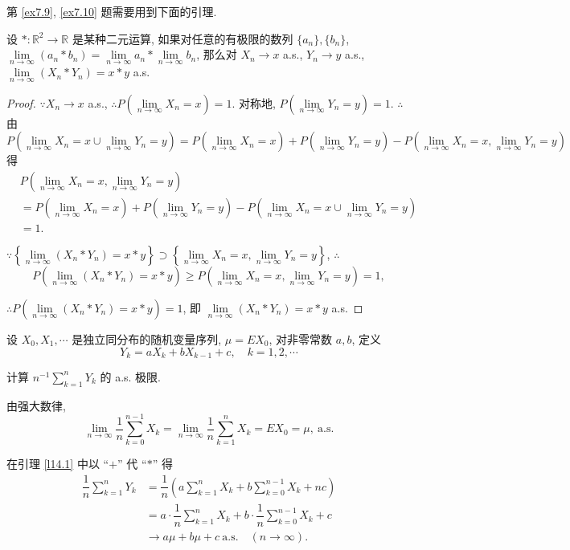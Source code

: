 \documentclass{ctexart}
\begin{document}
第 \ref{ex7.9}, \ref{ex7.10} 题需要用到下面的引理.
\begin{lemma}\label{l14.1}
    设 $*:\mathbb{R}^2\to\mathbb{R}$ 是某种二元运算, 如果对任意的有极限的数列 $\{a_n\},\{b_n\}$, $\lim\limits_{n\to\infty}(a_n*b_n)=\lim\limits_{n\to\infty}a_n*\lim\limits_{n\to\infty}b_n$, 那么对 $X_n\to x$ a.s., $Y_n\to y$ a.s., $\lim\limits_{n\to\infty}(X_n*Y_n)=x*y$ a.s.
\end{lemma}
\begin{proof}
    $\because X_n\to x$ a.s., $\therefore P\left(\lim\limits_{n\to\infty}X_n=x\right)=1$. 对称地, $P\left(\lim\limits_{n\to\infty}Y_n=y\right)=1$. $\therefore$ 由
    \[P\left(\lim\limits_{n\to\infty}X_n=x\cup\lim\limits_{n\to\infty}Y_n=y\right)=P\left(\lim\limits_{n\to\infty}X_n=x\right)+P\left(\lim\limits_{n\to\infty}Y_n=y\right)-P\left(\lim\limits_{n\to\infty}X_n=x,\lim\limits_{n\to\infty}Y_n=y\right)\]
    得
    \begin{align*}
        & P\left(\lim\limits_{n\to\infty}X_n=x,\lim\limits_{n\to\infty}Y_n=y\right) \\
        & =P\left(\lim\limits_{n\to\infty}X_n=x\right)+P\left(\lim\limits_{n\to\infty}Y_n=y\right)-P\left(\lim\limits_{n\to\infty}X_n=x\cup\lim\limits_{n\to\infty}Y_n=y\right) \\
        & =1.
    \end{align*}

    $\because\left\{\lim\limits_{n\to\infty}\left(X_n*Y_n\right)=x*y\right\}\supset\left\{\lim\limits_{n\to\infty}X_n=x,\lim\limits_{n\to\infty}Y_n=y\right\}$, $\therefore$
    \[P\left(\lim\limits_{n\to\infty}\left(X_n*Y_n\right)=x*y\right)\geq P\left(\lim\limits_{n\to\infty}X_n=x,\lim\limits_{n\to\infty}Y_n=y\right)=1,\]

    $\therefore P\left(\lim\limits_{n\to\infty}\left(X_n*Y_n\right)=x*y\right)=1$, 即 $\lim\limits_{n\to\infty}(X_n*Y_n)=x*y$ a.s.
\end{proof}
\begin{exercise}[有修改]\label{ex7.9}
    设 $X_0,X_1,\cdots$ 是独立同分布的随机变量序列, $\mu=EX_0$, 对非零常数 $a,b$, 定义
    \[Y_k=aX_k+bX_{k-1}+c,\quad k=1,2,\cdots\]

    计算 $n^{-1}\sum\limits_{k=1}^nY_k$ 的 a.s. 极限.
\end{exercise}
\begin{solution}
    由强大数律,
    \[\lim\limits_{n\to\infty}\dfrac{1}{n}\sum\limits_{k=0}^{n-1}X_k=\lim\limits_{n\to\infty}\dfrac{1}{n}\sum\limits_{k=1}^nX_k=EX_0=\mu,\ \text{a.s.}\]

    在引理 \ref{l14.1} 中以 ``$+$'' 代 ``$*$'' 得
    \begin{align*}
        \dfrac{1}{n}\sum\limits_{k=1}^nY_k & =\dfrac{1}{n}\left(a\sum\limits_{k=1}^nX_k+b\sum\limits_{k=0}^{n-1}X_k+nc\right) \\
        & =a\cdot\dfrac{1}{n}\sum\limits_{k=1}^nX_k+b\cdot\dfrac{1}{n}\sum\limits_{k=0}^{n-1}X_k+c \\
        & \to a\mu+b\mu+c\ \text{a.s.}\quad(n\to\infty).
    \end{align*}
\end{solution}
\end{document}
